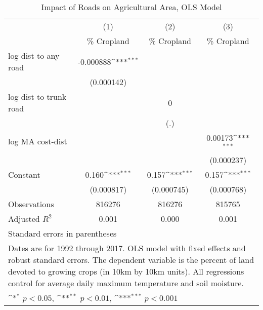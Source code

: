 \begin{table}[htbp]\centering
\def\sym#1{\ifmmode^{#1}\else\(^{#1}\)\fi}
\caption{Impact of Roads on Agricultural Area, OLS Model}
\begin{tabular}{l*{3}{c}}
\hline\hline
                    &\multicolumn{1}{c}{(1)}&\multicolumn{1}{c}{(2)}&\multicolumn{1}{c}{(3)}\\
                    &\multicolumn{1}{c}{\% Cropland}&\multicolumn{1}{c}{\% Cropland}&\multicolumn{1}{c}{\% Cropland}\\
\hline
log dist to any road&   -0.000888\sym{***}&                     &                     \\
                    &  (0.000142)         &                     &                     \\
[1em]
log dist to trunk road&                     &           0         &                     \\
                    &                     &         (.)         &                     \\
[1em]
log MA cost-dist    &                     &                     &     0.00173\sym{***}\\
                    &                     &                     &  (0.000237)         \\
[1em]
Constant            &       0.160\sym{***}&       0.157\sym{***}&       0.157\sym{***}\\
                    &  (0.000817)         &  (0.000745)         &  (0.000768)         \\
\hline
Observations        &      816276         &      816276         &      815765         \\
Adjusted \(R^{2}\)  &       0.001         &       0.000         &       0.001         \\
\hline\hline
\multicolumn{4}{l}{\footnotesize Standard errors in parentheses}\\
\multicolumn{4}{l}{\footnotesize Dates are for 1992 through 2017. OLS model with fixed effects and robust standard errors. The dependent variable is the percent of land devoted to growing crops (in 10km by 10km units). All regressions control for average daily maximum temperature and soil moisture.}\\
\multicolumn{4}{l}{\footnotesize \sym{*} \(p<0.05\), \sym{**} \(p<0.01\), \sym{***} \(p<0.001\)}\\
\end{tabular}
\end{table}
